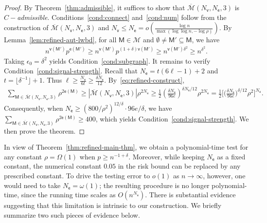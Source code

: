 \documentclass[letterpaper,11pt]{article}
\theoremstyle{definition}
\newcommand{\maM}{\mathcal{M}}
\newcommand{\en}{\mathsf{{e}}}
\newcommand{\vn}{\mathsf{{v}}}
\newcommand{\pth}[1]{\left( #1 \right)}
\newcommand{\sfM}{{\mathsf{M}}}
\newcommand{\sfe}{{\mathsf{e}}}
\newcommand{\sfv}{{\mathsf{v}}}
\begin{document}
\begin{proof}
    By Theorem~\ref{thm:admissible}, it suffices to show that $\overline{\maM}(N_\sfv,N_\sfe,3)$ is \emph{$C-$admissible}. Conditions~\ref{cond:connect} and~\ref{cond:num} follow from the construction of $\overline{\maM}(N_\sfv,N_\sfe,3)$ and $N_\sfv\le N_\sfe =o\pth{\frac{\log n}{\max(\log\log n,-\log \rho)}}$.
    By Lemma~\ref{lem:refined-aut-lwbd}, for all $\sfM\in \maM$ and $\emptyset\neq \sfM'\subseteq \sfM$, we have \begin{align*}
        n^{\vn(\sfM')}p^{\en(\sfM')}\ge n^{\vn(\sfM')}p^{(1+\delta)\vn(\sfM')}\ge n^{\vn(\sfM')\delta^2}\ge n^{\delta^2}.
    \end{align*}
    Taking $\epsilon_0 = \delta^2$ yields Condition~\ref{cond:subgraph}. It remains to verify Condition~\ref{cond:signal-strength}. Recall that $N_\sfe = t(6\ell-1)+2$ and $t = \lfloor \delta^{-1}\rfloor+1$. Thus $\ell\ge \frac{N_\sfe}{6t}\ge \frac{\delta N_\sfe}{12}$. By~\eqref{eq:refined-construct},\begin{align*}
        \sum_{\sfM\in \overline{\maM}(N_\sfv,N_\sfe,3)} \rho^{2\en(\sfM)}\ge |\overline{\maM}(N_\sfv,N_\sfe,3)|\rho^{2N_\sfe}\ge \frac{1}{2}\pth{\frac{\delta N_\sfe}{96 e}}^{\delta N_\sfe /12}\rho^{2N_\sfe} = \frac{1}{2}\Big[\Big(\frac{\delta N_\sfe}{96e}\Big)^{\delta /12}\rho^2\Big]^{N_\sfe}.
    \end{align*}
    Consequently, when $N_\sfe\ge (800/\rho^2)^{12/\delta}\cdot 96e/\delta$, we have $\sum_{\sfM\in \overline{\maM}(N_\sfv,N_\sfe,3)} \rho^{2\en(\sfM)}\ge 400$, which yields Condition~\ref{cond:signal-strength}. We then prove the theorem.
\end{proof}

In view of Theorem~\ref{thm:refined-main-thm}, we obtain a polynomial-time test for any constant $\rho=\Omega(1)$ when $p\ge n^{-1+\delta}$. Moreover, while keeping $N_{\sfe}$ as a fixed constant, the numerical constant $0.05$ in the risk bound can be replaced by any prescribed constant. To drive the testing error to $o(1)$ as $n\to\infty$, however, one would need to take $N_{\sfe}=\omega(1)$; the resulting procedure is no longer polynomial-time, since the running time scales as $O(n^{N_{\sfe}})$. There is substantial evidence suggesting that this limitation is intrinsic to our construction. We briefly summarize two such pieces of evidence below.
\end{document}
